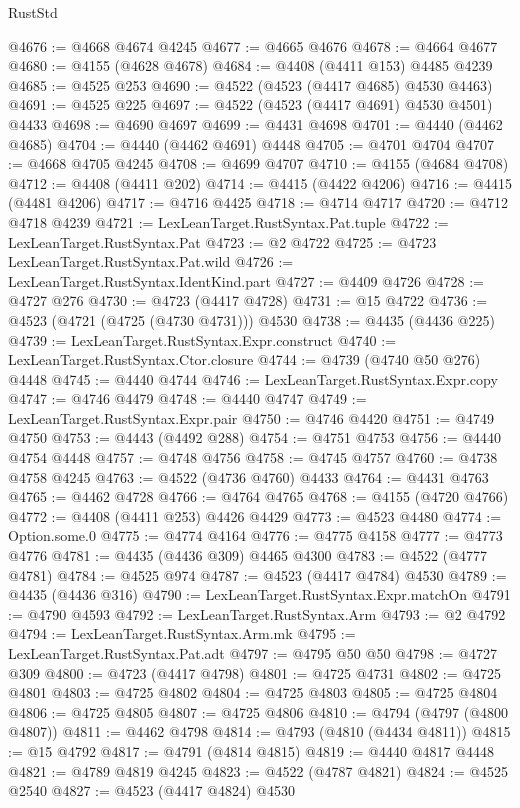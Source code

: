 \begin{lexlean}{RustStd}
\begin{coremodule}
{\begin{coremodule}
{{{{{{{{{{{{{{{{{{{{{{{{{{{{{{{{{{{{{{{{{{{{{{{{{{{{{{{{{{{{@4676 := @4668 @4674 @4245
@4677 := @4665 @4676
@4678 := @4664 @4677
@4680 := @4155 (@4628 @4678)
@4684 := @4408 (@4411 @153) @4485 @4239
@4685 := @4525 @253
@4690 := @4522 (@4523 (@4417 @4685) @4530 @4463)
@4691 := @4525 @225
@4697 := @4522 (@4523 (@4417 @4691) @4530 @4501) @4433
@4698 := @4690 @4697
@4699 := @4431 @4698
@4701 := @4440 (@4462 @4685)
@4704 := @4440 (@4462 @4691) @4448
@4705 := @4701 @4704
@4707 := @4668 @4705 @4245
@4708 := @4699 @4707
@4710 := @4155 (@4684 @4708)
@4712 := @4408 (@4411 @202)
@4714 := @4415 (@4422 @4206)
@4716 := @4415 (@4481 @4206)
@4717 := @4716 @4425
@4718 := @4714 @4717
@4720 := @4712 @4718 @4239
@4721 := LexLeanTarget.RustSyntax.Pat.tuple
@4722 := LexLeanTarget.RustSyntax.Pat
@4723 := @2 @4722
@4725 := @4723 LexLeanTarget.RustSyntax.Pat.wild
@4726 := LexLeanTarget.RustSyntax.IdentKind.part
@4727 := @4409 @4726
@4728 := @4727 @276
@4730 := @4723 (@4417 @4728)
@4731 := @15 @4722
@4736 := @4523 (@4721 (@4725 (@4730 @4731))) @4530
@4738 := @4435 (@4436 @225)
@4739 := LexLeanTarget.RustSyntax.Expr.construct
@4740 := LexLeanTarget.RustSyntax.Ctor.closure
@4744 := @4739 (@4740 @50 @276) @4448
@4745 := @4440 @4744
@4746 := LexLeanTarget.RustSyntax.Expr.copy
@4747 := @4746 @4479
@4748 := @4440 @4747
@4749 := LexLeanTarget.RustSyntax.Expr.pair
@4750 := @4746 @4420
@4751 := @4749 @4750
@4753 := @4443 (@4492 @288)
@4754 := @4751 @4753
@4756 := @4440 @4754 @4448
@4757 := @4748 @4756
@4758 := @4745 @4757
@4760 := @4738 @4758 @4245
@4763 := @4522 (@4736 @4760) @4433
@4764 := @4431 @4763
@4765 := @4462 @4728
@4766 := @4764 @4765
@4768 := @4155 (@4720 @4766)
@4772 := @4408 (@4411 @253) @4426 @4429
@4773 := @4523 @4480
@4774 := Option.some.{0}
@4775 := @4774 @4164
@4776 := @4775 @4158
@4777 := @4773 @4776
@4781 := @4435 (@4436 @309) @4465 @4300
@4783 := @4522 (@4777 @4781)
@4784 := @4525 @974
@4787 := @4523 (@4417 @4784) @4530
@4789 := @4435 (@4436 @316)
@4790 := LexLeanTarget.RustSyntax.Expr.matchOn
@4791 := @4790 @4593
@4792 := LexLeanTarget.RustSyntax.Arm
@4793 := @2 @4792
@4794 := LexLeanTarget.RustSyntax.Arm.mk
@4795 := LexLeanTarget.RustSyntax.Pat.adt
@4797 := @4795 @50 @50
@4798 := @4727 @309
@4800 := @4723 (@4417 @4798)
@4801 := @4725 @4731
@4802 := @4725 @4801
@4803 := @4725 @4802
@4804 := @4725 @4803
@4805 := @4725 @4804
@4806 := @4725 @4805
@4807 := @4725 @4806
@4810 := @4794 (@4797 (@4800 @4807))
@4811 := @4462 @4798
@4814 := @4793 (@4810 (@4434 @4811))
@4815 := @15 @4792
@4817 := @4791 (@4814 @4815)
@4819 := @4440 @4817 @4448
@4821 := @4789 @4819 @4245
@4823 := @4522 (@4787 @4821)
@4824 := @4525 @2540
@4827 := @4523 (@4417 @4824) @4530
}}}}}}}}}}}}}}}}}}}}}}}}}}}}}}}}}}}}}}}}}}}}}}}}}}}}}}}}}}}}
\end{coremodule}}
\end{coremodule}
\end{lexlean}

